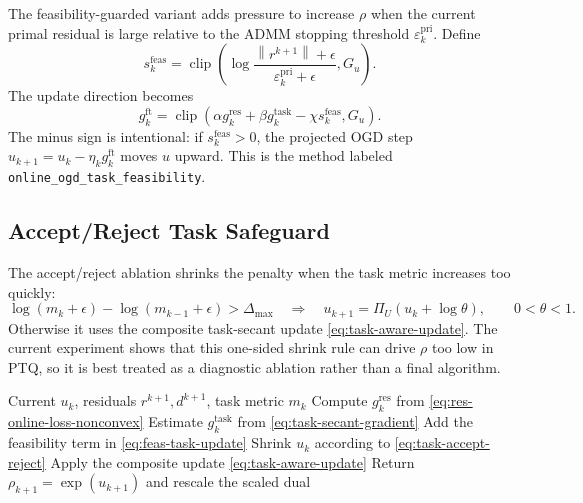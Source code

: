\documentclass[11pt]{article}
\newcommand{\clip}{\operatorname{clip}}
\newcommand{\norm}[1]{\left\lVert #1 \right\rVert}
\begin{document}
The feasibility-guarded variant adds pressure to increase \(\rho\) when the
current primal residual is large relative to the ADMM stopping threshold
\(\varepsilon_k^{\mathrm{pri}}\).  Define
\begin{equation}
    s_k^{\mathrm{feas}}
    =
    \clip\left(
        \log
        \frac{\norm{r^{k+1}}+\epsilon}
             {\varepsilon_k^{\mathrm{pri}}+\epsilon},
        G_u
    \right).
\end{equation}
The update direction becomes
\begin{equation}
    g_k^{\mathrm{ft}}
    =
    \clip\left(
        \alpha g_k^{\mathrm{res}}
        +\beta g_k^{\mathrm{task}}
        -\chi s_k^{\mathrm{feas}},
        G_u
    \right).
    \label{eq:feas-task-update}
\end{equation}
The minus sign is intentional: if \(s_k^{\mathrm{feas}}>0\), the projected OGD
step \(u_{k+1}=u_k-\eta_k g_k^{\mathrm{ft}}\) moves \(u\) upward.  This is the
method labeled \texttt{online\_ogd\_task\_feasibility}.

\subsection{Accept/Reject Task Safeguard}

The accept/reject ablation shrinks the penalty when the task metric increases
too quickly:
\begin{equation}
    \log(m_k+\epsilon)-\log(m_{k-1}+\epsilon)>\Delta_{\max}
    \quad\Longrightarrow\quad
    u_{k+1}=\Pi_U(u_k+\log\theta),
    \qquad 0<\theta<1.
    \label{eq:task-accept-reject}
\end{equation}
Otherwise it uses the composite task-secant update
\eqref{eq:task-aware-update}.  The current experiment shows that this
one-sided shrink rule can drive \(\rho\) too low in PTQ, so it is best treated
as a diagnostic ablation rather than a final algorithm.

\begin{algorithm}[t]
\caption{Task-aware online penalty update}
\label{alg:task-aware-penalty}
\begin{algorithmic}[1]
\Require Current \(u_k\), residuals \(r^{k+1},d^{k+1}\), task metric \(m_k\)
\State Compute \(g_k^{\mathrm{res}}\) from \eqref{eq:res-online-loss-nonconvex}
\State Estimate \(g_k^{\mathrm{task}}\) from \eqref{eq:task-secant-gradient}
    \State Add the feasibility term in \eqref{eq:feas-task-update}
    \State Shrink \(u_k\) according to \eqref{eq:task-accept-reject}
\Else
    \State Apply the composite update \eqref{eq:task-aware-update}
\EndIf
\State Return \(\rho_{k+1}=\exp(u_{k+1})\) and rescale the scaled dual
\end{algorithmic}
\end{algorithm}
\end{document}
